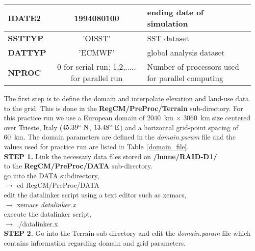 \begin{table}[h]
\begin{center}
\begin{tabular}{|l|c|l|}
{\footnotesize {\bf IDATE2}}   & {\footnotesize {1994080100}} & {\footnotesize ending date of simulation} \\ \hline
{\footnotesize {\bf SSTTYP}}   & {\footnotesize {'OISST'}} & {\footnotesize SST dataset }\\ \hline
{\footnotesize {\bf DATTYP}}   & {\footnotesize {'ECMWF'}} & {\footnotesize global analysis dataset} \\ \hline
{\footnotesize {\bf NPROC}}   & {\footnotesize {0 for serial run;  1,2,..... for parallel run}} & {\footnotesize Number of processors used for parallel computing} \\ \hline
\end{tabular}
\end{center}
\end{table}


\noindent
The first step is to define the domain and interpolate elevation and land-use data to the
grid.  This is done in the {\bf RegCM/PreProc/Terrain} sub-directory.  For this practice run we 
use a European domain of 2040~km $\times$ 3060~km size centered over Trieste, 
Italy ($45.39^{\circ}~{\rm N}$, $ 13.48^{\circ}~{\rm E}$) and a horizontal grid-point
spacing of 60~km.  The domain parameters are defined in the {\it domain.param} file and  
the values used for practice run are listed in Table~\ref{domain_file}. \\

\noindent
{\bf STEP 1.}  Link the necessary data files stored on {\bf /home/RAID-D1/} \\
 to the {\bf RegCM/PreProc/DATA} sub-directory. \\ 

\noindent
go into the DATA subdirectory, \\

\indent 
$\rightarrow$ cd RegCM/PreProc/DATA \\ 

\noindent
edit the datalinker script using a text editor such as xemacs, \\

\indent
$\rightarrow$ xemacs {\it datalinker.x} \\ 

\noindent
execute the datalinker script, \\

\indent
$\rightarrow$ ./datalinker.x \\

\noindent
{\bf STEP 2.}  Go into the Terrain sub-directory and edit the {\it domain.param} file which contains
information regarding domain and grid parameters.  \\ 

